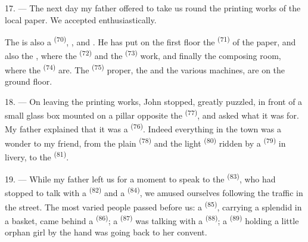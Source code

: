 \VUsaut{3.0mm}

17. --- The next day my father offered to take us round the printing works
of the local paper. We accepted enthusiastically.

The  is also a  \textsuperscript{(70)},
,  and . He has put on
the first floor the  \textsuperscript{(71)} of the paper, and
also the , where the 
\textsuperscript{(72)} and the  \textsuperscript{(73)} work, and
finally the composing room, where the  \textsuperscript{(74)} are.
The  \textsuperscript{(75)} proper, the  and
the various machines, are on the ground floor.

\VUsaut{3.0mm}

18. --- On leaving the printing works, John stopped, greatly puzzled, in
front of a small glass box mounted on a pillar opposite the
 \textsuperscript{(77)}, and asked what it was for. My father
explained that it was a  \textsuperscript{(76)}. Indeed everything
in the town was a wonder to my friend, from the plain
 \textsuperscript{(78)} and the light
 \textsuperscript{(80)} ridden by a 
\textsuperscript{(79)} in livery, to the  \textsuperscript{(81)}.

19. --- While my father left us for a moment to speak to the
 \textsuperscript{(83)}, who had stopped to talk with a
 \textsuperscript{(82)} and a  \textsuperscript{(84)}, we amused
ourselves following the traffic in the street. The most varied people
passed before us: a  \textsuperscript{(85)}, carrying a
splendid  in a basket, came behind a 
\textsuperscript{(86)}; a  \textsuperscript{(87)} was talking with a
 \textsuperscript{(88)}; a  \textsuperscript{(89)} holding a little
orphan girl by the hand was going back to her convent.

\VUsaut{3.0mm}

